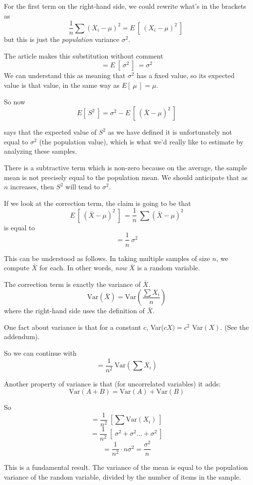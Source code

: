 \documentclass[11pt, oneside]{article}
\begin{document}
For the first term on the right-hand side, we could rewrite what's in the brackets as
\[ \frac{1}{n} \sum (X_i - \mu)^2 = E \ [ \ (X_i - \mu)^2 \ ] \ \]
but this is just the \emph{population} variance $\sigma^2$.

The article makes this substitution without comment
\[ = E \ [ \ \sigma^2 \ ] \  = \sigma^2 \]
We can understand this as meaning that $\sigma^2$ has a fixed value, so its expected value is that value, in the same way as $E[ \ \mu \ ] = \mu$.  

So now
\[ E[ \ S^2 \ ] = \sigma^2  - E \ [ \ (\bar{X} - \mu)^2 \ ]  \]

says that the expected value of $S^2$ as we have defined it is unfortunately not equal to $\sigma^2$ (the population value), which is what we'd really like to estimate by analyzing these samples.

There is a subtractive term which is non-zero because on the average, the sample mean is not precisely equal to the population mean.  We should anticipate that as $n$ increases, then $S^2$ will tend to $\sigma^2$.

If we look at the correction term, the claim is going to be that
\[ E \ [ \ (\bar{X} - \mu)^2 \ ] \ = \frac{1}{n} \ \sum (\bar{X} - \mu)^2 \]
is equal to 
\[ = \frac{1}{n} \ \sigma^2 \]

This can be understood as follows.  In taking multiple samples of size $n$, we compute $\bar{X}$ for each.  In other words, \emph{now} $\bar{X}$ is a random variable.  

The correction term is exactly the variance of $\bar{X}$.
\[  \text{Var}(\bar{X}) =  \text{Var}(\frac{\sum X_i}{n} ) \]
where the right-hand side uses the definition of $\bar{X}$.

One fact about variance is that for a constant $c$, Var($cX) = c^2$ Var$(X)$.  (See the addendum).

So we can continue with
\[ = \frac{1}{n^2} \ \text{Var} (\sum X_i) \]

Another property of variance is that (for uncorrelated variables) it adds:
\[ \text{Var}(A + B) = \text{Var}(A) + \text{Var}(B) \]

So
\[ = \frac{1}{n^2} \ [ \sum \text{Var}(X_i) \ ] \]
\[ =  \frac{1}{n^2} \ [ \ \sigma^2 + \sigma^2 \dots + \sigma^2 \ ] \]
\[ = \frac{1}{n^2} \cdot n \sigma^2 = \frac{\sigma^2}{n} \]

This is a fundamental result.  The variance of the mean is equal to the population variance of the random variable, divided by the number of items in the sample.  
\end{document}
